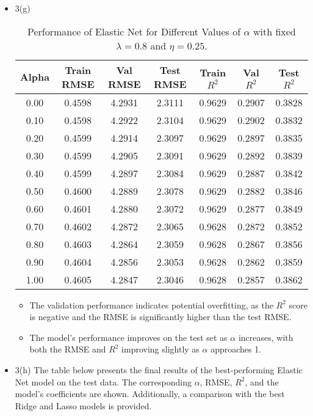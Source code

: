 \documentclass[10pt,letterpaper]{article}
\begin{document}
\begin{itemize}
    \newpage
    \item {3(g)}
        \begin{table}[H]
            \centering
            \begin{tabular}{ccccccc}
            \toprule
            \textbf{Alpha} & \textbf{Train RMSE} & \textbf{Val RMSE} & \textbf{Test RMSE} & \textbf{Train \(R^2\)} & \textbf{Val \(R^2\)} & \textbf{Test \(R^2\)} \\
            \midrule
            0.00 & 0.4598 & 4.2931 & 2.3111 & 0.9629 & 0.2907 & 0.3828 \\
            0.10 & 0.4598 & 4.2922 & 2.3104 & 0.9629 & 0.2902 & 0.3832 \\
            0.20 & 0.4599 & 4.2914 & 2.3097 & 0.9629 & 0.2897 & 0.3835 \\
            0.30 & 0.4599 & 4.2905 & 2.3091 & 0.9629 & 0.2892 & 0.3839 \\
            0.40 & 0.4599 & 4.2897 & 2.3084 & 0.9629 & 0.2887 & 0.3842 \\
            0.50 & 0.4600 & 4.2889 & 2.3078 & 0.9629 & 0.2882 & 0.3846 \\
            0.60 & 0.4601 & 4.2880 & 2.3072 & 0.9629 & 0.2877 & 0.3849 \\
            0.70 & 0.4602 & 4.2872 & 2.3065 & 0.9628 & 0.2872 & 0.3852 \\
            0.80 & 0.4603 & 4.2864 & 2.3059 & 0.9628 & 0.2867 & 0.3856 \\
            0.90 & 0.4604 & 4.2856 & 2.3053 & 0.9628 & 0.2862 & 0.3859 \\
            1.00 & 0.4605 & 4.2847 & 2.3046 & 0.9628 & 0.2857 & 0.3862 \\
            \bottomrule
            \end{tabular}
            \caption{Performance of Elastic Net for Different Values of \( \alpha \) with fixed \( \lambda = 0.8 \) and \( \eta = 0.25 \).}
            \label{tab:elastic_net_results}
        \end{table}
        \begin{itemize}
            \item The validation performance indicates potential overfitting, as the $R^2$
            score is negative and the RMSE is significantly higher than the test RMSE.
            \item The model's performance improves on the test set as $\alpha$
            increases, with both the RMSE and $R^2$
            improving slightly as $\alpha$ approaches 1.
        \end{itemize}
    \newpage
    \item {3(h)}
        The table below presents the final results of the best-performing Elastic Net model on the test data. The corresponding \( \alpha \), RMSE, \( R^2 \), and the model's coefficients are shown. Additionally, a comparison with the best Ridge and Lasso models is provided.


\end{itemize}
\end{document}
